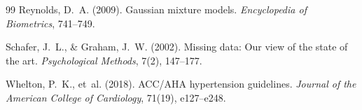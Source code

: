 \documentclass[twocolumn, fontsize=10pt]{article}
\begin{document}
\begin{thebibliography}{99}
Reynolds, D.~A. (2009).
\newblock Gaussian mixture models.
\newblock \textit{Encyclopedia of Biometrics}, 741--749.

Schafer, J.~L., \& Graham, J.~W. (2002).
\newblock Missing data: Our view of the state of the art.
\newblock \textit{Psychological Methods}, 7(2), 147--177.

Whelton, P.~K., et~al. (2018).
 ACC/AHA hypertension guidelines.
\newblock \textit{Journal of the American College of Cardiology}, 71(19),
e127--e248.


\end{thebibliography}
\end{document}
